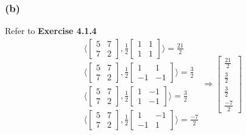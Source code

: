\documentclass{article}
\begin{document}
\subsubsection*{(b)}
Refer to \textbf{Exercise 4.1.4}
\begin{equation*}
    \begin{split}
        & \langle \begin{bmatrix}
            5 & 7 \\7 & 2
        \end{bmatrix}, \frac{1}{2} \begin{bmatrix}
            1 & 1 \\ 1 & 1
        \end{bmatrix} \rangle = \frac{21}{2} \\
        & \langle \begin{bmatrix}
            5 & 7 \\7 & 2
        \end{bmatrix}, \frac{1}{2} \begin{bmatrix}
            1 & 1 \\ -1 & -1
        \end{bmatrix} \rangle = \frac{3}{2} \\
        & \langle \begin{bmatrix}
            5 & 7 \\7 & 2
        \end{bmatrix}, \frac{1}{2} \begin{bmatrix}
            1 & -1 \\ 1 & -1
        \end{bmatrix} \rangle = \frac{3}{2} \\
        & \langle \begin{bmatrix}
            5 & 7 \\7 & 2
        \end{bmatrix}, \frac{1}{2} \begin{bmatrix}
            1 & -1 \\ -1 & 1
        \end{bmatrix} \rangle = \frac{-7}{2} 
    \end{split}
    \Rightarrow \begin{bmatrix}
        \frac{21}{2} \\ \frac{3}{2} \\ \frac{3}{2} \\ \frac{-7}{2} 
    \end{bmatrix}
\end{equation*}
\end{document}
